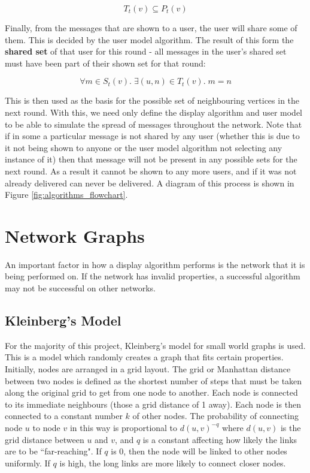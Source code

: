 \documentclass[bsc,frontabs,twoside,singlespacing,parskip,deptreport]{infthesis}     %
\begin{document}
\begin{equation}
T_{t}(v) \subseteq P_{t}(v)
\end{equation}

Finally, from the messages that are shown to a user, the user will share some of them. This is decided by the user model algorithm. The result of this form the \textbf{shared set} of that user for this round - all messages in the user's shared set must have been part of their shown set for that round:

\begin{equation}
\forall m \in S_{t}(v) .\; \exists (u, n) \in T_{t}(v) .\; m = n
\end{equation}

This is then used as the basis for the possible set of neighbouring vertices in the next round. With this, we need only define the display algorithm and user model to be able to simulate the spread of messages throughout the network. Note that if in some a particular message is not shared by any user (whether this is due to it not being shown to anyone or the user model algorithm not selecting any instance of it) then that message will not be present in any possible sets for the next round. As a result it cannot be shown to any more users, and if it was not already delivered can never be delivered. A diagram of this process is shown in Figure \ref{fig:algorithms_flowchart}.

\section{Network Graphs} \label{sec:graph_def}
An important factor in how a display algorithm performs is the network that it is being performed on. If the network has invalid properties, a successful algorithm may not be successful on other networks.

\subsection{Kleinberg's Model}

For the majority of this project, Kleinberg's model for small world graphs is used\cite{Kleinberg00}. This is a model which randomly creates a graph that fits certain properties. Initially, nodes are arranged in a grid layout. The grid or Manhattan distance between two nodes is defined as the shortest number of steps that must be taken along the original grid to get from one node to another. Each node is connected to its immediate neighbours (those a grid distance of 1 away). Each node is then connected to a constant number $k$ of other nodes. The probability of connecting node $u$ to node $v$ in this way is proportional to $d(u, v)^{-q}$ where $d(u, v)$ is the grid distance between $u$ and $v$, and $q$ is a constant affecting how likely the links are to be ``far-reaching". If $q$ is 0, then the node will be linked to other nodes uniformly. If $q$ is high, the long links are more likely to connect closer nodes.
\end{document}
